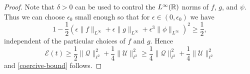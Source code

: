 \begin{proof}
	Note that \(\delta>0\) can be used to control the \(L^\infty(\mathbb{R})\) norms of \(f\), \(g\), and \(\psi\). Thus we can choose \(\epsilon_0\) small enough so that for \(\epsilon \in (0,\epsilon_0)\) we have 
	\begin{equation*}
		1 - \frac 12 \left( \epsilon \| f\|_{L^\infty} + \epsilon \|g\|_{L^\infty} + \epsilon^3 \| \phi \|_{L^\infty} \right)^2 \geq \frac 12,
	\end{equation*}
	independent of the particular choices of \(f\) and \(g\). 	Hence
	\begin{equation*}
		\mathcal E(t) \geq \frac 1 2 \| \mathcal Q \|_{\ell^2}^2 + \frac 1 4 \| \mathcal U\|_{\ell^2}^2 \geq \frac 1 4\| \mathcal Q \|_{\ell^2}^2 + \frac 1 4 \| \mathcal U\|_{\ell^2}^2
	\end{equation*}
	and \cref{coercive-bound} follows.
	

\end{proof}
